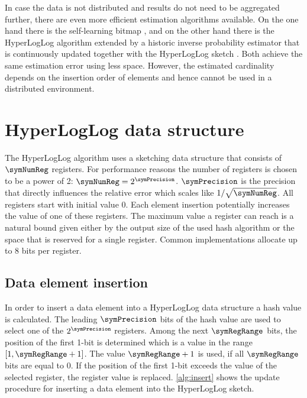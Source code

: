 \documentclass[a4paper]{scrartcl}
\begin{document}
In case the data is not distributed and results do not need to be aggregated further, there are even more efficient estimation algorithms available. On the one hand there is the self-learning bitmap \cite{Chen2011, Chen2015}, and on the other hand there is the HyperLogLog algorithm extended by a historic inverse probability estimator that is continuously updated together with the HyperLogLog sketch \cite{Ting2014}. Both achieve the same estimation error using less space. However, the estimated cardinality depends on the insertion order of elements and hence cannot be used in a distributed environment. 


\section{HyperLogLog data structure}
The HyperLogLog algorithm uses a sketching data structure that consists of $\symNumReg$ registers. For performance reasons the number of registers is chosen to be a power of 2: $\symNumReg = 2^\symPrecision$. $\symPrecision$ is the precision that directly influences the relative error which scales like $1/\sqrt{\symNumReg}$. All registers start with initial value 0. Each element insertion potentially increases the value of one of these registers. The maximum value a register can reach is a natural bound given either by the output size of the used hash algorithm or the space that is reserved for a single register. Common implementations allocate up to 8 bits per register.

\subsection{Data element insertion}
\label{sec:data_element_insertion}
In order to insert a data element into a HyperLogLog data structure a hash value is calculated. The leading $\symPrecision$ bits of the hash value are used to select one of the $2^\symPrecision$ registers. Among the next $\symRegRange$ bits, the position of the first 1-bit is determined which is a value in the range $[1,\symRegRange+1]$. The value $\symRegRange+1$ is used, if all $\symRegRange$ bits are equal to 0. If the position of the first 1-bit exceeds the value of the selected register, the register value is replaced. \cref{alg:insert} shows the update procedure for inserting a data element into the HyperLogLog sketch.
\end{document}
